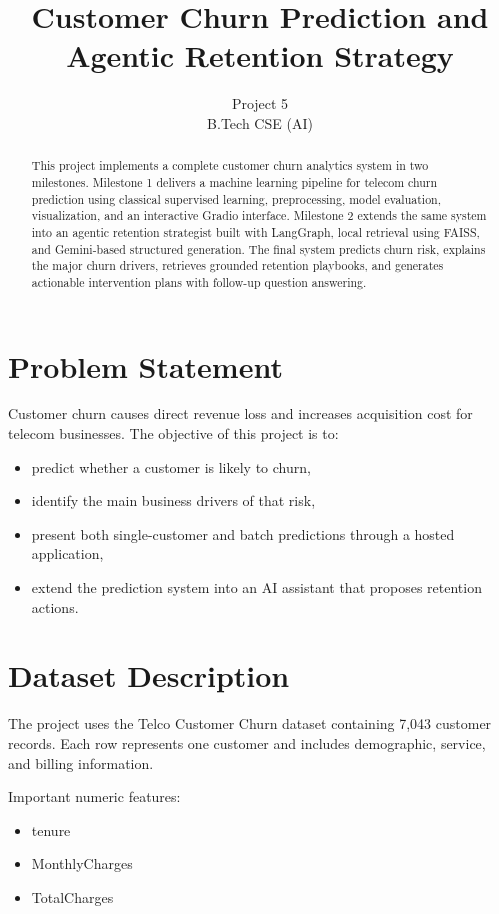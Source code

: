 \documentclass[12pt]{article}
\title{Customer Churn Prediction and Agentic Retention Strategy}
\author{Project 5 \\ B.Tech CSE (AI)}
\date{}
\begin{document}
\maketitle

\begin{abstract}
This project implements a complete customer churn analytics system in two milestones. Milestone 1 delivers a machine learning pipeline for telecom churn prediction using classical supervised learning, preprocessing, model evaluation, visualization, and an interactive Gradio interface. Milestone 2 extends the same system into an agentic retention strategist built with LangGraph, local retrieval using FAISS, and Gemini-based structured generation. The final system predicts churn risk, explains the major churn drivers, retrieves grounded retention playbooks, and generates actionable intervention plans with follow-up question answering.
\end{abstract}

\section{Problem Statement}
Customer churn causes direct revenue loss and increases acquisition cost for telecom businesses. The objective of this project is to:
\begin{itemize}
    \item predict whether a customer is likely to churn,
    \item identify the main business drivers of that risk,
    \item present both single-customer and batch predictions through a hosted application,
    \item extend the prediction system into an AI assistant that proposes retention actions.
\end{itemize}

\section{Dataset Description}
The project uses the Telco Customer Churn dataset containing 7,043 customer records. Each row represents one customer and includes demographic, service, and billing information.

Important numeric features:
\begin{itemize}
    \item tenure
    \item MonthlyCharges
    \item TotalCharges
\end{itemize}
\end{document}
